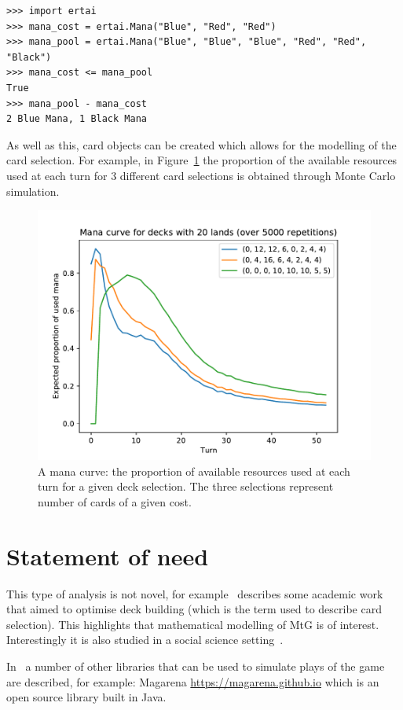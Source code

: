 \documentclass{article}
\begin{document}
\begin{verbatim}
>>> import ertai
>>> mana_cost = ertai.Mana("Blue", "Red", "Red")
>>> mana_pool = ertai.Mana("Blue", "Blue", "Blue", "Red", "Red", "Black")
>>> mana_cost <= mana_pool
True
>>> mana_pool - mana_cost
2 Blue Mana, 1 Black Mana

\end{verbatim}

As well as this, card objects can be created which allows for the modelling of
the card selection. For example, in Figure~\ref{fig:mana_curve} 
the proportion of the available resources used at each turn for 3 different
card selections is obtained through Monte Carlo simulation.

\begin{figure}[!htbp]
    \begin{center}
        \includegraphics[width=.5\textwidth]{./img/mana_curve/main.pdf}
    \end{center}
    \caption{A mana curve: the proportion of available resources used at each
    turn for a given deck selection. The three selections represent number of
    cards of a given cost.}\label{fig:mana_curve}
\end{figure}

\section{Statement of need}

This type of analysis is not novel, for example~\cite{bjorke2017deckbuilding}
describes some academic work that aimed to optimise deck building (which is the
term used to describe card selection). This highlights that mathematical
modelling of MtG is of interest. Interestingly it is also studied in a social
science setting~\cite{vsvelch2020mediatization}.

In~\cite{bjorke2017deckbuilding} a number
of other libraries that can be used to simulate plays of the game are described,
for example: Magarena \url{https://magarena.github.io} which is an open source
library built in Java.
\end{document}

